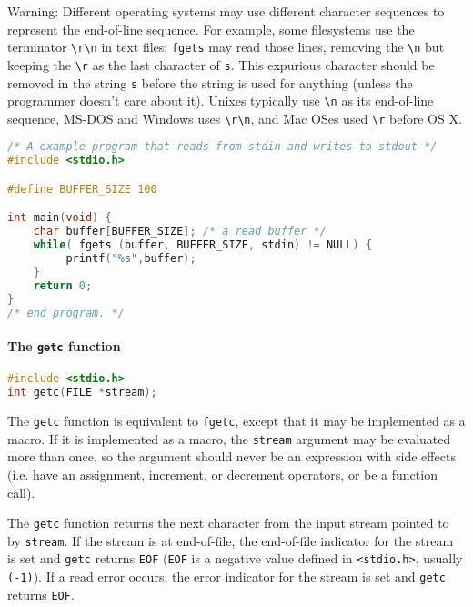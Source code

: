 Warning: Different operating systems may use different character sequences to
represent the end-of-line sequence. For example, some filesystems use the
terminator \texttt{\textbackslash{}r\textbackslash{}n} in text files;
\texttt{fgets} may read those lines, removing the \texttt{\textbackslash{}n}
but keeping the \texttt{\textbackslash{}r} as the last character of \texttt{s}.
This expurious character should be removed in the string \texttt{s} before the
string is used for anything (unless the programmer doesn't care about it).
Unixes typically use \texttt{\textbackslash{}n} as its end-of-line sequence,
MS-DOS and Windows uses \texttt{\textbackslash{}r\textbackslash{}n}, and Mac
OSes used \texttt{\textbackslash{}r} before OS X.
\lstset{basicstyle=\scriptsize, numbers=left, captionpos=b, tabsize=4}
\begin{lstlisting}[caption=Section \thesection listing \arabic{filecnt},language={C},
breaklines=true,xleftmargin=15pt,label=lst:section\thesection listing\arabic{filecnt}]
/* A example program that reads from stdin and writes to stdout */
#include <stdio.h>

#define BUFFER_SIZE 100

int main(void) {
	char buffer[BUFFER_SIZE]; /* a read buffer */
	while( fgets (buffer, BUFFER_SIZE, stdin) != NULL) {
	     printf("%s",buffer);
	}
	return 0;
}
/* end program. */
\end{lstlisting}

\paragraph{The \texttt{getc} function}
\lstset{basicstyle=\scriptsize, numbers=left, captionpos=b, tabsize=4}
\begin{lstlisting}[caption=Section \thesection listing \arabic{filecnt},language={C},
breaklines=true,xleftmargin=15pt,label=lst:section\thesection listing\arabic{filecnt}]
#include <stdio.h>
int getc(FILE *stream);
\end{lstlisting}

The \texttt{getc} function is equivalent to \texttt{fgetc}, except that it may
be implemented as a macro. If it is implemented as a macro, the \texttt{stream}
argument may be evaluated more than once, so the argument should never be an
expression with side effects (i.e. have an assignment, increment, or decrement
operators, or be a function call).

The \texttt{getc} function returns the next character from the input stream
pointed to by \texttt{stream}. If the stream is at end-of-file, the end-of-file
indicator for the stream is set and \texttt{getc} returns \texttt{EOF}
(\texttt{EOF} is a negative value defined in
\texttt{\textless{}stdio.h\textgreater{}}, usually \texttt{(-1)}). If a read
error occurs, the error indicator for the stream is set and \texttt{getc}
returns \texttt{EOF}.

